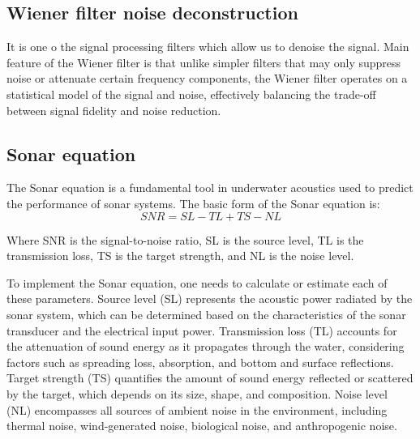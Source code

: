 \subsection{Wiener filter noise deconstruction}

It is one o the signal processing filters which allow us to denoise the signal. Main feature of the Wiener filter is that unlike simpler filters that may only suppress noise or attenuate certain frequency components, the Wiener filter operates on a statistical model of the signal and noise, effectively balancing the trade-off between signal fidelity and noise reduction.


\subsection{Sonar equation }
The Sonar equation is a fundamental tool in underwater acoustics used to predict the performance of sonar systems. 
The basic form of the Sonar equation is:
\begin{equation}
    SNR=SL-TL+TS-NL
\end{equation}

Where
SNR is the signal-to-noise ratio,
SL is the source level,
TL is the transmission loss,
TS is the target strength, and
NL is the noise level.

To implement the Sonar equation, one needs to calculate or estimate each of these parameters. 
Source level (SL) represents the acoustic power radiated by the sonar system, which can be determined based on the characteristics of the sonar transducer and the electrical input power. 
Transmission loss (TL) accounts for the attenuation of sound energy as it propagates through the water, considering factors such as spreading loss, absorption, and bottom and surface reflections. 
Target strength (TS) quantifies the amount of sound energy reflected or scattered by the target, which depends on its size, shape, and composition. 
Noise level (NL) encompasses all sources of ambient noise in the environment, including thermal noise, wind-generated noise, biological noise, and anthropogenic noise.

